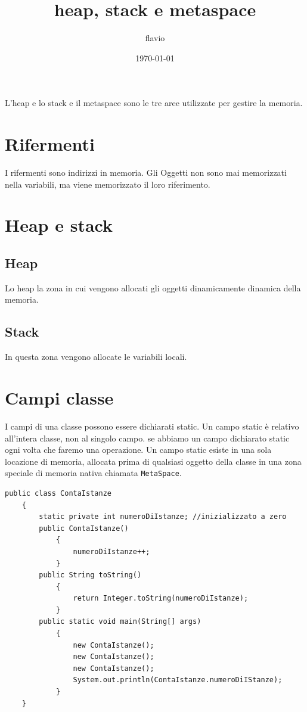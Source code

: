\documentclass[11pt]{article}
\author{flavio}
\date{\today}
\title{heap, stack e metaspace}
\begin{document}
\maketitle
\tableofcontents

L'heap e lo stack e il metaspace sono le tre aree utilizzate per gestire la memoria.
\section{Rifermenti}
\label{sec:org001cbde}
I rifermenti sono indirizzi in memoria. Gli Oggetti non sono mai memorizzati nella variabili, ma viene memorizzato il loro riferimento.
\section{Heap e stack}
\label{sec:orga7eb20b}
\subsection{Heap}
\label{sec:org6897c0b}
Lo heap la zona in cui vengono allocati gli oggetti dinamicamente dinamica della memoria.
\subsection{Stack}
\label{sec:org9973193}
In questa zona vengono allocate le variabili locali.
\section{Campi classe}
\label{sec:org16bc98a}
I campi di una classe possono essere dichiarati static. Un campo static è relativo all'intera classe, non al singolo campo. se abbiamo un campo dichiarato static ogni volta che faremo una operazione. Un campo static esiste in una sola locazione di memoria, allocata prima di qualsiasi oggetto della
classe in una zona speciale di memoria nativa chiamata \texttt{MetaSpace}.

\begin{verbatim}
public class ContaIstanze
    {
        static private int numeroDiIstanze; //inizializzato a zero
        public ContaIstanze()
            {
                numeroDiIstanze++;
            }
        public String toString()
            {
                return Integer.toString(numeroDiIstanze);
            }
        public static void main(String[] args)
            {
                new ContaIstanze();
                new ContaIstanze();
                new ContaIstanze();
                System.out.println(ContaIstanze.numeroDiIStanze);
            }
    }

\end{verbatim}
\end{document}
